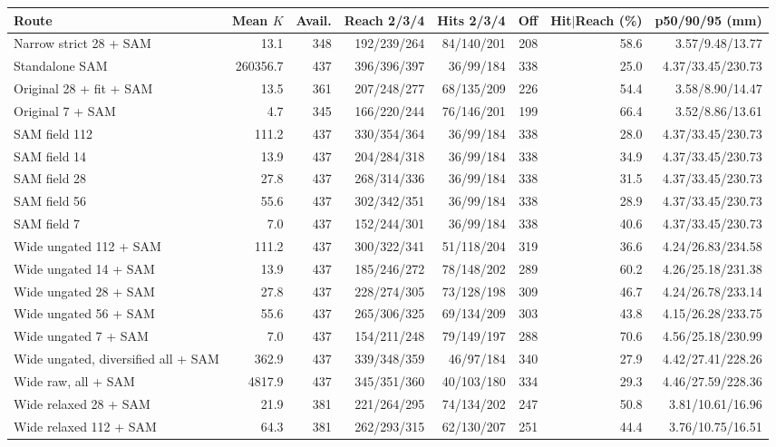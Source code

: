 \begin{tabular}{lrrrrrrr}
\toprule
Route & Mean $K$ & Avail. & Reach 2/3/4 & Hits 2/3/4 & Off & Hit$\mid$Reach (\%) & p50/90/95 (mm) \\
\midrule
Narrow strict 28 + SAM & 13.1 & 348 & 192/239/264 & 84/140/201 & 208 & 58.6 & 3.57/9.48/13.77 \\
Standalone SAM & 260356.7 & 437 & 396/396/397 & 36/99/184 & 338 & 25.0 & 4.37/33.45/230.73 \\
Original 28 + fit + SAM & 13.5 & 361 & 207/248/277 & 68/135/209 & 226 & 54.4 & 3.58/8.90/14.47 \\
Original 7 + SAM & 4.7 & 345 & 166/220/244 & 76/146/201 & 199 & 66.4 & 3.52/8.86/13.61 \\
SAM field 112 & 111.2 & 437 & 330/354/364 & 36/99/184 & 338 & 28.0 & 4.37/33.45/230.73 \\
SAM field 14 & 13.9 & 437 & 204/284/318 & 36/99/184 & 338 & 34.9 & 4.37/33.45/230.73 \\
SAM field 28 & 27.8 & 437 & 268/314/336 & 36/99/184 & 338 & 31.5 & 4.37/33.45/230.73 \\
SAM field 56 & 55.6 & 437 & 302/342/351 & 36/99/184 & 338 & 28.9 & 4.37/33.45/230.73 \\
SAM field 7 & 7.0 & 437 & 152/244/301 & 36/99/184 & 338 & 40.6 & 4.37/33.45/230.73 \\
Wide ungated 112 + SAM & 111.2 & 437 & 300/322/341 & 51/118/204 & 319 & 36.6 & 4.24/26.83/234.58 \\
Wide ungated 14 + SAM & 13.9 & 437 & 185/246/272 & 78/148/202 & 289 & 60.2 & 4.26/25.18/231.38 \\
Wide ungated 28 + SAM & 27.8 & 437 & 228/274/305 & 73/128/198 & 309 & 46.7 & 4.24/26.78/233.14 \\
Wide ungated 56 + SAM & 55.6 & 437 & 265/306/325 & 69/134/209 & 303 & 43.8 & 4.15/26.28/233.75 \\
Wide ungated 7 + SAM & 7.0 & 437 & 154/211/248 & 79/149/197 & 288 & 70.6 & 4.56/25.18/230.99 \\
Wide ungated, diversified all + SAM & 362.9 & 437 & 339/348/359 & 46/97/184 & 340 & 27.9 & 4.42/27.41/228.26 \\
Wide raw, all + SAM & 4817.9 & 437 & 345/351/360 & 40/103/180 & 334 & 29.3 & 4.46/27.59/228.36 \\
Wide relaxed 28 + SAM & 21.9 & 381 & 221/264/295 & 74/134/202 & 247 & 50.8 & 3.81/10.61/16.96 \\
Wide relaxed 112 + SAM & 64.3 & 381 & 262/293/315 & 62/130/207 & 251 & 44.4 & 3.76/10.75/16.51 \\

\end{tabular}
